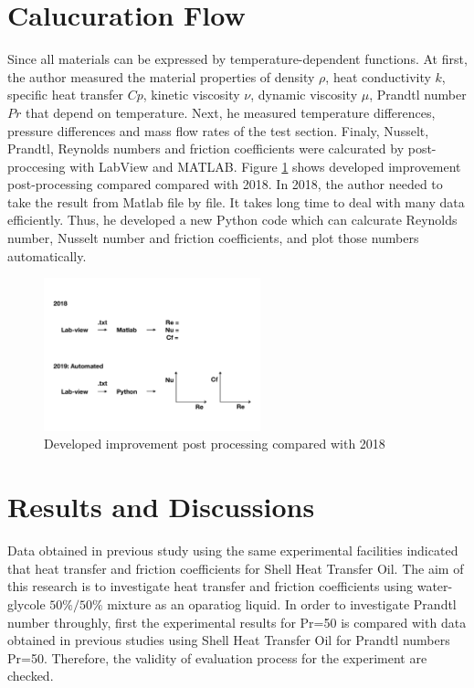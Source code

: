 \documentclass[conference]{IEEEtran}
\begin{document}
\section{Calucuration Flow}
Since all materials can be expressed by temperature-dependent functions.
At first, the author measured the material properties of density $\rho$,  heat conductivity $k$, specific heat transfer $Cp$, kinetic viscosity $\nu$, dynamic viscosity $\mu$, Prandtl number $Pr$ that depend on temperature.
Next, he measured temperature differences, pressure differences and mass flow rates of the test section.
Finaly, Nusselt, Prandtl, Reynolds numbers and friction coefficients were calcurated by post-proccesing with LabView and MATLAB.
Figure \ref{post_processing} shows developed improvement post-processing compared compared with 2018.
In 2018, the author needed to take the result from Matlab file by file.
It takes long time to deal with many data efficiently.
Thus, he developed a new Python code which can calcurate Reynolds number, Nusselt number and friction coefficients, and plot those numbers  automatically.
\begin{figure}[htbp]
  \centering
  \vspace{-6zh}
  \includegraphics[width=0.56\textwidth, natwidth=920,natheight=720]{fig/post_processing.pdf}
  \vspace{-3zh}
  \caption{Developed improvement post processing compared with 2018}
  \label{post_processing}
\end{figure}

\section{Results and Discussions}
Data obtained in previous study\cite{Christphan2018} using the same experimental facilities indicated that heat transfer and friction coefficients for Shell Heat Transfer Oil.
The aim of this research is to investigate heat transfer and friction coefficients using  water-glycole $50\%/50\%$ mixture as an oparatiog liquid.
In order to investigate Prandtl number throughly, first the experimental results for Pr=50 is compared with data obtained in previous studies \cite{Christphan2018} using Shell Heat Transfer Oil for Prandtl numbers Pr=50.
Therefore, the validity of evaluation process for the experiment are checked.\\
\end{document}

